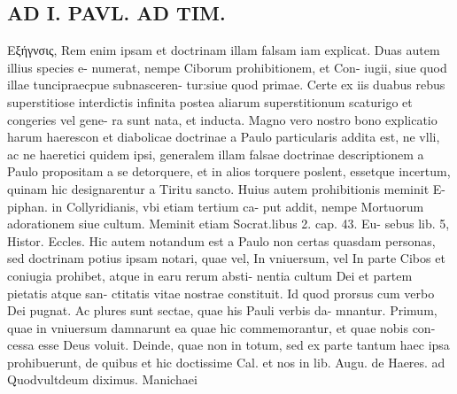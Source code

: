 \documentclass{article}
\begin{document}
\begin{pages}
\section*{AD I. PAVL. AD TIM. }
\marginpar{[ p.400 ]}\pstart Εξήγνσις, Rem enim ipsam et doctrinam illam falsam iam explicat. Duas autem illius species e- numerat, nempe Ciborum prohibitionem, et Con- iugii, siue quod illae tuncipraecpue subnasceren- tur:siue quod primae. Certe ex iis duabus rebus superstitiose interdictis infinita postea aliarum superstitionum scaturigo et congeries vel gene- ra sunt nata, et inducta. Magno vero nostro bono explicatio harum haerescon et diabolicae doctrinae a Paulo particularis addita est, ne vlli, ac ne haeretici quidem ipsi, generalem illam falsae doctrinae descriptionem a Paulo propositam a se detorquere, et in alios torquere poslent, essetque incertum, quinam hic designarentur a Tiritu sancto. Huius autem prohibitionis meminit E- piphan. in Collyridianis, vbi etiam tertium ca- put addit, nempe Mortuorum adorationem siue cultum. Meminit etiam Socrat.libus 2. cap. 43. Eu- sebus lib. 5, Histor. Eccles. Hic autem notandum est a Paulo non certas quasdam personas, sed doctrinam potius ipsam notari, quae vel, In vniuersum, vel In parte Cibos et coniugia prohibet, atque in earu rerum absti- nentia cultum Dei et partem pietatis atque san- ctitatis vitae nostrae constituit. Id quod prorsus cum verbo Dei pugnat. Ac plures sunt sectae, quae his Pauli verbis da- mnantur. Primum, quae in vniuersum damnarunt ea quae hic commemorantur, et quae nobis con- cessa esse Deus voluit. Deinde, quae non in totum, sed ex parte tantum haec ipsa prohibuerunt, de quibus et hic doctissime Cal. et nos in lib.  Augu. de Haeres. ad Quodvultdeum diximus. Manichaei  \pend

\end{pages}
\end{document}

